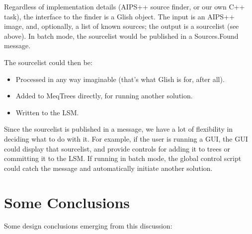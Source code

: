 \documentclass[12pt]{article}
\begin{document}
  Regardless of implementation details (AIPS++ source finder, or our own C++ 
  task), the interface to the finder is a Glish object. The input is an AIPS++
  image, and, optionally, a list of known sources; the output is a sourcelist
  (see above). In batch mode, the sourcelist would be published in a
  Sources.Found message.

  The sourcelist could then be:
  
  \begin{itemize}
  
  \item Processed in any way imaginable (that's what Glish is for, after all).
        
  \item Added to MeqTrees directly, for running another solution.
  
  \item Written to the LSM.
  
  \end{itemize}
  
  Since the sourcelist is published in a message, we have a lot of flexibility
  in deciding what to do with it. For example, if the user is running a GUI,
  the GUI could display that sourcelist, and provide controls for adding it to
  trees or committing it to the LSM. If running in batch mode, the global
  control script could catch the message and automatically initiate another
  solution. 
  
\section{Some Conclusions}

  Some design conclusions emerging from this discussion:
  
\end{document}
